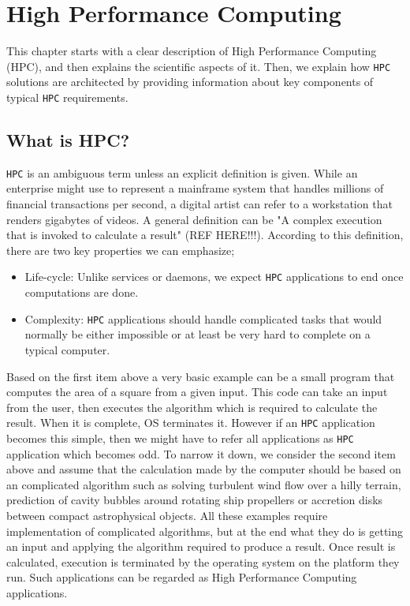 \chapter{High Performance Computing} \label{chap-hpc}
This chapter starts with a clear description of High Performance Computing (HPC), and then
explains the scientific aspects of it. Then, we explain how \texttt{HPC} solutions are architected
by providing information about key components of typical \texttt{HPC} requirements.

\section{What is HPC?}
\texttt{HPC} is an ambiguous term unless an explicit definition is given. While an enterprise might 
use to represent a mainframe system that handles millions of financial transactions per second, 
a digital artist can refer to a workstation that renders gigabytes of videos. A general 
definition can be "A complex execution that is invoked to calculate a result" (REF HERE!!!). 
According to this definition, there are two key properties we can emphasize; 
\begin{itemize}
  \item Life-cycle: Unlike services or daemons, we expect \texttt{HPC} applications to end once 
computations are done.
  \item Complexity: \texttt{HPC} applications should handle complicated tasks that would normally 
be either impossible or at least be very hard to complete on a typical computer.
\end{itemize}
Based on the first item above a very basic example can be a small program that computes 
the area of a square from a given input. This code can take an input from the user, then 
executes the algorithm which is required to calculate the result. When it is complete, OS 
terminates it. 
\newline \newline
However if an \texttt{HPC} application becomes this simple, then we might have to refer all 
applications as \texttt{HPC} application which becomes odd. To narrow it down, we consider the 
second item above and assume that the calculation made by the computer should be based 
on an complicated algorithm such as solving turbulent wind flow over a hilly terrain, 
prediction of cavity bubbles around rotating ship propellers or accretion disks between 
compact astrophysical objects. 
\newline \newline
All these examples require implementation of complicated algorithms, but at the end what 
they do is getting an input and applying the algorithm required to produce a result. 
Once result is calculated, execution is terminated by the operating system on the platform 
they run. Such applications can be regarded as High Performance Computing applications.  

